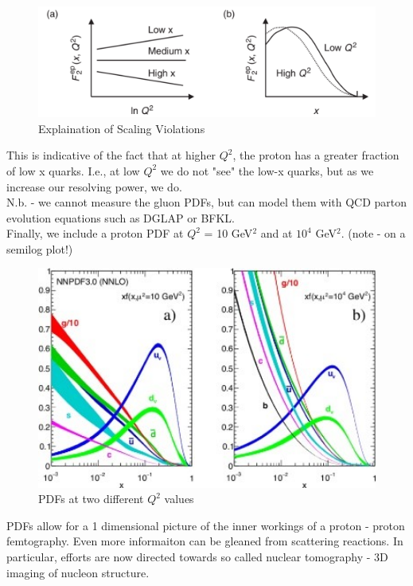                 
        \begin{figure}[H]
            \centering
            \includegraphics[width=12cm]{Chapters/Ch1-Intro/Ch1-Sec1-Background/pics/inelastic-ep/scaling-violations.PNG}
            \caption{Explaination of Scaling Violations}
        \end{figure}
        
        This is indicative of the fact that at higher $Q^2$, the proton has a greater fraction of low x quarks. I.e., at low $Q^2$ we do not "see" the low-x quarks, but as we increase our resolving power, we do.\\
        \newline
        N.b. - we cannot measure the gluon PDFs, but can model them with QCD parton evolution equations such as DGLAP or BFKL.\\
        \newline
        Finally, we include a proton PDF at $Q^2$ = 10 GeV$^2$ and at $10^4$ GeV$^2$. (note - on a semilog plot!)
        
               
        \begin{figure}[H]
            \centering
            \includegraphics[width=14cm]{Chapters/Ch1-Intro/Ch1-Sec1-Background/pics/inelastic-ep/PDFs.jpg}
            \caption{PDFs at two different $Q^2$ values}
        \end{figure}

     PDFs allow for a 1 dimensional picture of the inner workings of a proton - proton femtography. Even more informaiton can be gleaned from scattering reactions. In particular, efforts are now directed towards so called nuclear tomography - 3D imaging of nucleon structure.  

\clearpage
